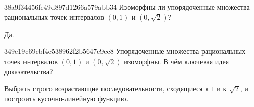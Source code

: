 \begin{note}{38a9f34456fe49d897d1266a579abb34}
    Изоморфны ли упорядоченные множества рациональных точек интервалов \({ (0, 1) }\) и \({ (0, \sqrt{2}) }\)?

    \begin{cloze}{1}
        Да.
    \end{cloze}
\end{note}

\begin{note}{349e19c69cbf4e538962f2b5647c9ec8}
    Упорядоченные множества рациональных точек интервалов \({ (0, 1) }\) и \({ (0, \sqrt{2}) }\) изоморфны.
    В чём ключевая идея доказательства?

    \begin{cloze}{1}
        Выбрать строго возрастающие последовательности, сходящиеся к \({ 1 }\) и к \({ \sqrt{2} }\), и построить кусочно-линейную функцию.
    \end{cloze}
\end{note}


